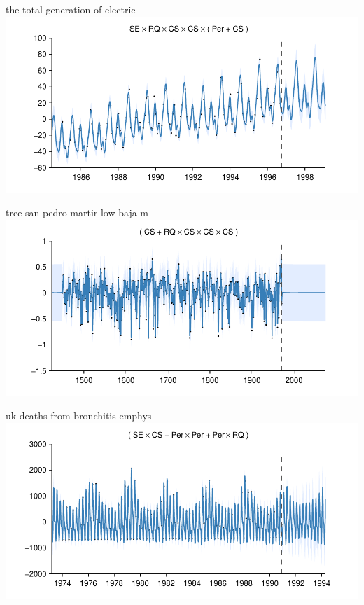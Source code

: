     
\begin{frame}{the-total-generation-of-electric}
  \center
  \includegraphics[width=1.0\textwidth]{figures/the-total-generation-of-electric/the-total-generation-of-electric_all}
\end{frame}  


    
\begin{frame}{tree-san-pedro-martir-low-baja-m}
  \center
  \includegraphics[width=1.0\textwidth]{figures/tree-san-pedro-martir-low-baja-m/tree-san-pedro-martir-low-baja-m_all}
\end{frame}  


    
\begin{frame}{uk-deaths-from-bronchitis-emphys}
  \center
  \includegraphics[width=1.0\textwidth]{figures/uk-deaths-from-bronchitis-emphys/uk-deaths-from-bronchitis-emphys_all}
\end{frame}  


